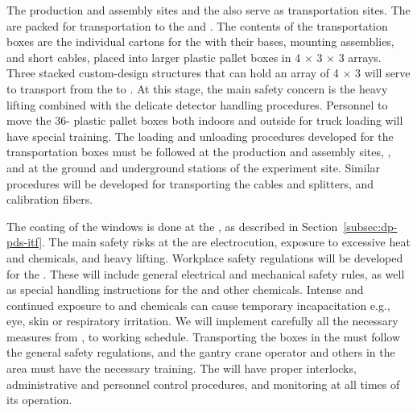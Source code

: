 The production and assembly sites and the  also serve as transportation sites. The  are packed for transportation to the  and . The contents of the transportation boxes are the individual cartons for the  with their bases, mounting assemblies, and short cables, placed into larger plastic pallet boxes in \num{4} $\times$ \num{3} $\times$ \num{3} arrays. %
Three stacked custom-design structures that can hold an array of \num{4} $\times$ \num{3}  will serve to transport  from the  to \surf. 
At this stage, the main safety concern is the heavy lifting combined with the delicate detector handling procedures. 
Personnel to move the \num{36}- plastic pallet boxes both indoors and outside for truck loading will have special training. The loading and unloading procedures developed for the  transportation boxes must be followed at the production and assembly sites, , and at the ground and underground stations of the experiment site. Similar procedures will be developed for transporting the  cables and splitters, and calibration fibers.

The  coating of the  windows is done at the , as described in Section~\ref{subsec:dp-pds-itf}. %
The main safety risks at the  are electrocution, exposure to excessive heat and chemicals, and heavy lifting. Workplace safety regulations will be developed for the . These will include general electrical and mechanical safety rules, as well as special handling instructions for the  and other chemicals. Intense and continued exposure to  and chemicals can cause temporary incapacitation e.g., eye, skin or respiratory irritation. We will implement carefully all the necessary measures from , to working schedule. %
Transporting the  boxes in the  must follow the general safety regulations, and the gantry crane operator and others in the area must have the necessary training. The  will have proper interlocks, administrative and personnel control procedures, and monitoring at all times of its operation.

